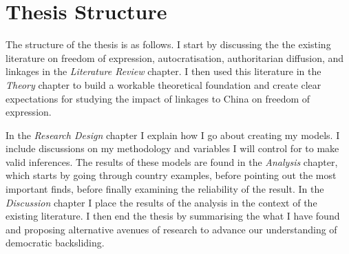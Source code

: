 \section{Thesis Structure}
The structure of the thesis is as follows. I start by discussing the the existing literature on freedom of expression, autocratisation, authoritarian diffusion, and linkages in the \textit{Literature Review} chapter. I then used this literature in the \textit{Theory} chapter to build a workable theoretical foundation and create clear expectations for studying the impact of linkages to China on freedom of expression.

In the \textit{Research Design} chapter I explain how I go about creating my models. I include discussions on my methodology and variables I will control for to make valid inferences. The results of these models are found in the \textit{Analysis} chapter, which starts by going through country examples, before pointing out the most important finds, before finally examining the reliability of the result. In the \textit{Discussion} chapter I place the results of the analysis in the context of the existing literature. I then end the thesis by summarising the what I have found and proposing alternative avenues of research to advance our understanding of democratic backsliding.
